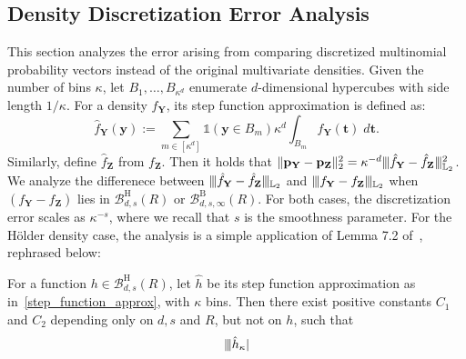 \documentclass[twoside,11pt]{article}
\newcommand{\Ell}{\mathbb{L}}
\newcommand{\EllTwo}{\Ell_2} %
\newcommand{\rvTwo}{Y}
\newcommand{\rvThree}{Z}
\newcommand{\vectorize}[1]{\mathbf{#1}}
\newcommand{\dimDensity}{d} %
\newcommand{\vectorIndex}{m}
\newcommand{\probVec}{\mathbf{p}} %
\newcommand{\smoothness}{s}
\newcommand{\ballRadius}{R}
\newcommand{\binNum}{\kappa}           %
\newcommand{\ballDistn}{\mathcal{B}}
\newcommand{\besovBall}[2]{\ballDistn_{\dimDensity,\smoothness, #2}^{\mathrm{B}}(\ballRadius)}
\newcommand{\holderBall}{\ballDistn_{\dimDensity, \smoothness}^{\mathrm{H}}(\ballRadius)} %
\begin{document}
\begin{appendix}
	\subsection{Density Discretization Error Analysis}\label{appendix:disc_error}
	This section analyzes the error arising from comparing discretized multinomial probability vectors instead of the original multivariate densities.
	Given the number of bins $\binNum$, let ${B_1, \dots, B_{\binNum^{\dimDensity}}}$ enumerate  $\dimDensity$-dimensional hypercubes with side length $1/\binNum$. For a density $f_{\vectorize{Y}}$, its step function approximation is defined as:
	\begin{equation}\label{step_function_approx}
		\hat{f}_{\vectorize{Y}}(\vectorize{y})
		:=
		\sum_{ \vectorIndex \in [\binNum^\dimDensity] }
		\mathds{1}(\mathbf{y} \in B_\vectorIndex)
		\binNum^\dimDensity
		\int_{
			B_\vectorIndex
		}
		f_{\vectorize{Y}}(\vectorize{t})\;
		d\vectorize{t}.
	\end{equation}
	Similarly, define $\hat{f}_{\vectorize{Z}}$ from $f_{\vectorize{Z}}$. 
	Then it holds that $\| \probVec_{\vectorize{\rvTwo}} - \probVec_{\vectorize{\rvThree}}\|_2^2 = \binNum^{-\dimDensity}
	\vert\kern-0.25ex
	\vert\kern-0.25ex
	\vert
	\hat{f}_{\vectorize{Y}} - \hat{f}_{\vectorize{Z}}
	\vert\kern-0.25ex
	\vert\kern-0.25ex
	\vert_{\EllTwo}
	^2$.
	We analyze the differenece between 
	$\vert\kern-0.25ex
	\vert\kern-0.25ex
	\vert
	\hat{f}_{\vectorize{Y}} - \hat{f}_{\vectorize{Z}}
	\vert\kern-0.25ex
	\vert\kern-0.25ex
	\vert_{\EllTwo}$
	and
	$\vert\kern-0.25ex
	\vert\kern-0.25ex
	\vert
	f_{\vectorize{Y}} - f_{\vectorize{Z}}
	\vert\kern-0.25ex
	\vert\kern-0.25ex
	\vert_{\EllTwo}$
	when $(f_{\vectorize{Y}} - f_{\vectorize{Z}})$ lies in $\holderBall$ or $\besovBall{}{\infty}$.
	For both cases, the discretization error scales as $\binNum^{-\smoothness}$, where we recall that $\smoothness$ is the smoothness parameter. For the H\"{o}lder density case, the analysis is a simple application of  Lemma 7.2 of~\citet{Arias-Castro2018RememberDimension}, rephrased below:
	\begin{lemma}\label{lemma:arias}
		For a function $h \in \holderBall$, let $\hat{h}$ be its step function approximation as in~\eqref{step_function_approx}, with $\kappa$ bins.
		Then there exist positive constants $C_1$ and $C_2$ depending only on $\dimDensity, \smoothness$ and  $\ballRadius$, but not on $h$, such that
		\begin{align*}
			\vert\kern-0.25ex
			\vert\kern-0.25ex
			\vert 
			\hat{h}_\binNum
			\vert\kern-0.25ex

\end{align*}
\end{lemma}
\end{appendix}
\end{document}
